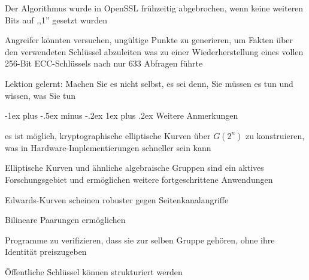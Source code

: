 \documentclass[a4paper]{article}
\makeatletter
\renewcommand{\subsubsection}{\@startsection{subsubsection}{3}{0mm}%
 {-1ex plus -.5ex minus -.2ex}%
 {1ex plus .2ex}%
 {\normalfont\small\bfseries}}
\makeatother
\begin{document}
\begin{multicols}{3}
\begin{itemize*}
\begin{itemize*}
                  \item Der Algorithmus wurde in OpenSSL frühzeitig abgebrochen, wenn keine weiteren Bits auf ,,1'' gesetzt wurden
                  \item Angreifer könnten versuchen, ungültige Punkte zu generieren, um Fakten über den verwendeten Schlüssel abzuleiten was zu einer Wiederherstellung eines vollen 256-Bit ECC-Schlüssels nach nur 633 Abfragen führte
            \end{itemize*}
            \item Lektion gelernt: Machen Sie es nicht selbst, es sei denn, Sie müssen es tun und wissen, was Sie tun
      \end{itemize*}

      \subsubsection{Weitere Anmerkungen}
      \begin{itemize*}
            \item es ist möglich, kryptographische elliptische Kurven über $G(2^n)$ zu konstruieren, was in Hardware-Implementierungen schneller sein kann
            \item Elliptische Kurven und ähnliche algebraische Gruppen sind ein aktives Forschungsgebiet und ermöglichen weitere fortgeschrittene Anwendungen
            \begin{itemize*}
                  \item Edwards-Kurven scheinen robuster gegen Seitenkanalangriffe
                  \item Bilineare Paarungen ermöglichen
                  \item Programme zu verifizieren, dass sie zur selben Gruppe gehören, ohne ihre Identität preiszugeben
                  \item Öffentliche Schlüssel können strukturiert werden%
            \end{itemize*}
      \end{itemize*}


\end{multicols}
\end{document}
